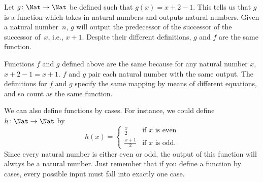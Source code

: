 \documentclass[../../../include/open-logic-section]{subfiles}
\begin{document}
\begin{ex}
Let $g \colon \Nat \to \Nat$ be defined such that $g(x) = x+2-1$. This
tells us that $g$ is a function which takes in natural numbers and
outputs natural numbers. Given a natural number~$n$, $g$ will output
the predecessor of the successor of the successor of~$x$, i.e.,
$x+1$. Despite their different definitions, $g$ and $f$ are the same
function.
\end{ex}

\begin{explain}
Functions $f$ and $g$ defined above are the same because for any
natural number $x$, $x+2-1 = x+1$. $f$ and $g$ pair each natural
number with the same output. The definitions for $f$ and $g$ specify
the same mapping by means of different equations, and so count as the
same function.
\end{explain}

\begin{ex}
We can also define functions by cases. For instance, we could define
$h \colon \Nat \to \Nat$  by
\[
h(x) =
\begin{cases}
  \frac{x}{2} & \text{if $x$ is even} \\
  \frac{x+1}{2} & \text{if $x$ is odd.}
\end{cases}
\]
Since every natural number is either even or odd, the output of this
function will always be a natural number. Just remember that if you
define a function by cases, every possible input must fall into
exactly one case.
\end{ex}
\end{document}
